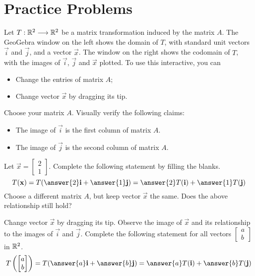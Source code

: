 \documentclass{ximera}
\begin{document}
\section*{Practice Problems}
\begin{problem}\label{exp:linCombStUnitVectors}
Let $T:\mathbb{R}^2\longrightarrow \mathbb{R}^2$ be a matrix transformation induced by the matrix $A$.  The GeoGebra window on the left shows the domain of $T$, with standard unit vectors $\vec{i}$ and $\vec{j}$, and a vector $\vec{x}$.  The window  on the right shows the codomain of $T$, with the images of $\vec{i}$, $\vec{j}$ and $\vec{x}$ plotted.  To use this interactive, you can 
\begin{itemize}
    \item Change the entries of matrix $A$;
    \item Change vector $\vec{x}$ by dragging its tip.
\end{itemize}
\begin{center}
\end{center}
Choose your matrix $A$.  Visually verify the following claims:
\begin{itemize}
    \item The image of $\vec{i}$ is the first column of matrix $A$.
    \item The image of $\vec{j}$ is the second column of matrix $A$.
\end{itemize}
Let $\vec{x}=\begin{bmatrix}2\\1\end{bmatrix}$.  Complete the following statement by filling the blanks.
$$T(\vec{x})=T(\answer{2}\vec{i}+\answer{1}\vec{j})=\answer{2}T(\vec{i})+\answer{1}T(\vec{j})$$
Choose a different matrix $A$, but keep vector $\vec{x}$ the same.  Does the above relationship still hold?

Change vector $\vec{x}$ by dragging its tip.  Observe the image of $\vec{x}$ and its relationship to the images of $\vec{i}$ and $\vec{j}$.  Complete the following statement for all vectors $\begin{bmatrix}a\\b\end{bmatrix}$ in $\mathbb{R}^2$.
$$T\left(\begin{bmatrix}a\\b\end{bmatrix}\right)=T(\answer{a}\vec{i}+\answer{b}\vec{j})=\answer{a}T(\vec{i})+\answer{b}T(\vec{j})$$
\end{problem}
\end{document}
